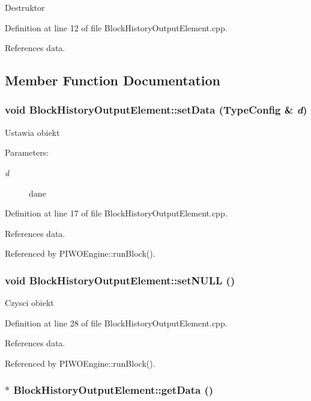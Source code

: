 Destruktor 

Definition at line 12 of file BlockHistoryOutputElement.cpp.

References data.

\subsection{Member Function Documentation}
\hypertarget{classBlockHistoryOutputElement_c6a108725145c059f2c3caa4740f7fab}{
\subsubsection[setData]{\setlength{\rightskip}{0pt plus 5cm}void BlockHistoryOutputElement::setData ({\bf TypeConfig} \& {\em d})}}
\label{classBlockHistoryOutputElement_c6a108725145c059f2c3caa4740f7fab}


Ustawia obiekt \begin{Desc}
\item[Parameters:]
\begin{description}
\item[{\em d}]dane \end{description}
\end{Desc}


Definition at line 17 of file BlockHistoryOutputElement.cpp.

References data.

Referenced by PIWOEngine::runBlock().\hypertarget{classBlockHistoryOutputElement_18ce3d2033c394df5c9e478b97f3d4eb}{
\subsubsection[setNULL]{\setlength{\rightskip}{0pt plus 5cm}void BlockHistoryOutputElement::setNULL ()}}
\label{classBlockHistoryOutputElement_18ce3d2033c394df5c9e478b97f3d4eb}


Czysci obiekt 

Definition at line 28 of file BlockHistoryOutputElement.cpp.

References data.

Referenced by PIWOEngine::runBlock().\hypertarget{classBlockHistoryOutputElement_5c3aada39e483d277c9b52c0a4b3c549}{
\subsubsection[getData]{ $\ast$ BlockHistoryOutputElement::getData ()}}
\label{classBlockHistoryOutputElement_5c3aada39e483d277c9b52c0a4b3c549}


